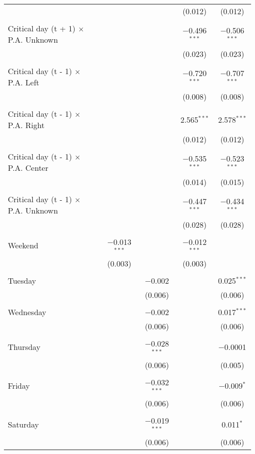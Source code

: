 \documentclass[
]{article}
\begin{document}
\begin{table}[!htbp]
{\begin{tabular}{@{\extracolsep{5pt}}lcccc}
  &  &  & (0.012) & (0.012) \\ 
  & & & & \\ 
 Critical day (t + 1) $\times$ P.A. Unknown &  &  & $-$0.496$^{***}$ & $-$0.506$^{***}$ \\ 
  &  &  & (0.023) & (0.023) \\ 
  & & & & \\ 
 Critical day (t - 1) $\times$ P.A. Left &  &  & $-$0.720$^{***}$ & $-$0.707$^{***}$ \\ 
  &  &  & (0.008) & (0.008) \\ 
  & & & & \\ 
 Critical day (t - 1) $\times$ P.A. Right &  &  & 2.565$^{***}$ & 2.578$^{***}$ \\ 
  &  &  & (0.012) & (0.012) \\ 
  & & & & \\ 
 Critical day (t - 1) $\times$ P.A. Center &  &  & $-$0.535$^{***}$ & $-$0.523$^{***}$ \\ 
  &  &  & (0.014) & (0.015) \\ 
  & & & & \\ 
 Critical day (t - 1) $\times$ P.A. Unknown &  &  & $-$0.447$^{***}$ & $-$0.434$^{***}$ \\ 
  &  &  & (0.028) & (0.028) \\ 
  & & & & \\ 
 Weekend & $-$0.013$^{***}$ &  & $-$0.012$^{***}$ &  \\ 
  & (0.003) &  & (0.003) &  \\ 
  & & & & \\ 
 Tuesday &  & $-$0.002 &  & 0.025$^{***}$ \\ 
  &  & (0.006) &  & (0.006) \\ 
  & & & & \\ 
 Wednesday &  & $-$0.002 &  & 0.017$^{***}$ \\ 
  &  & (0.006) &  & (0.006) \\ 
  & & & & \\ 
 Thursday &  & $-$0.028$^{***}$ &  & $-$0.0001 \\ 
  &  & (0.006) &  & (0.005) \\ 
  & & & & \\ 
 Friday &  & $-$0.032$^{***}$ &  & $-$0.009$^{*}$ \\ 
  &  & (0.006) &  & (0.006) \\ 
  & & & & \\ 
 Saturday &  & $-$0.019$^{***}$ &  & 0.011$^{*}$ \\ 
  &  & (0.006) &  & (0.006) \\ 

\end{tabular}}
\end{table}
\end{document}
